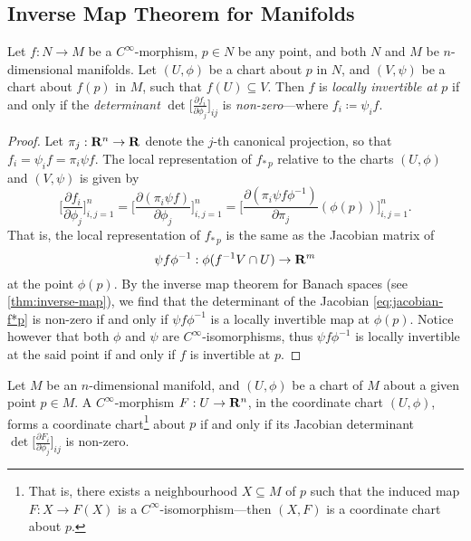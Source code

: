 \subsection{Inverse Map Theorem for Manifolds}

\begin{theorem}
    \label{thm:inverse-map-theorem-manifolds}
    Let \(f: N \to M\) be a \(C^{\infty}\)-morphism, \(p \in N\) be any point, and
    both \(N\) and \(M\) be \(n\)-dimensional manifolds. Let \((U, \phi)\) be a
    chart about \(p\) in \(N\), and \((V, \psi)\) be a chart about \(f(p)\) in
    \(M\), such that \(f(U) \subseteq V\). Then \(f\) is \emph{locally invertible at
        \(p\)} if and only if the \emph{determinant}
    \(\det \big[\frac{\partial f_i}{\partial \phi_j}\big]_{ij}\) is
    \emph{non-zero}---where \(f_i \coloneq \psi_i f\).
\end{theorem}

\begin{proof}
    Let \(\pi_j: \mathbf{R}^n \to \mathbf{R}\) denote the \(j\)-th canonical projection, so that
    \(f_i = \psi_i f = \pi_i \psi f\). The local representation of \(f_{*\, p}\)
    relative to the charts \((U, \phi)\) and \((V, \psi)\) is given by
    \begin{equation}\label{eq:jacobian-f*p}
        \Big[ \frac{\partial f_{i}}{\partial \phi_{j}} \Big]_{i, j=1}^n
        = \Big[ \frac{\partial (\pi_i \psi f)}{\partial \phi_{j}} \Big]_{i, j=1}^n
        = \Big[
            \frac{\partial (\pi_i \psi f \phi^{-1})}{\partial \pi_j}(\phi(p))
            \Big]_{i, j=1}^n.
    \end{equation}
    That is, the local representation of \(f_{*\, p}\) is the same as the Jacobian
    matrix of
    \[
        \psi f \phi^{-1}: \phi(f^{-1} V \cap U) \to \mathbf{R}^m
    \]
    at the point \(\phi(p)\). By the inverse map theorem for Banach spaces (see
    \cref{thm:inverse-map}), we find that the determinant of the Jacobian
    \cref{eq:jacobian-f*p} is non-zero if and only if \(\psi f \phi^{-1}\) is a
    locally invertible map at \(\phi(p)\). Notice however that both \(\phi\) and
    \(\psi\) are \(C^{\infty}\)-isomorphisms, thus \(\psi f \phi^{-1}\) is locally
    invertible at the said point if and only if \(f\) is invertible at \(p\).
\end{proof}

\begin{corollary}
    \label{cor:inverse-map-theorem-manifolds}
    Let \(M\) be an \(n\)-dimensional manifold, and \((U, \phi)\) be a chart of
    \(M\) about a given point \(p \in M\). A \(C^{\infty}\)-morphism
    \(F: U \to \mathbf{R}^n\), in the coordinate chart \((U, \phi)\), forms a coordinate
    chart\footnote{
        That is, there exists a neighbourhood \(X \subseteq M\) of \(p\)
        such that the induced map \(F: X \to F(X)\) is a
        \(C^{\infty}\)-isomorphism---then \((X, F)\) is a coordinate chart about
        \(p\).
    } about \(p\) if and only if its Jacobian determinant
    \(\det \big[\frac{\partial F_{i}}{\partial \phi_j}\big]_{ij}\) is non-zero.
\end{corollary}

